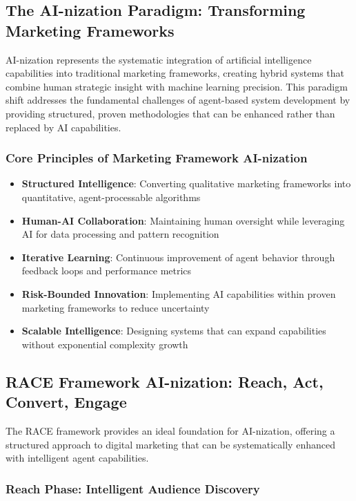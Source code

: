 \subsection{The AI-nization Paradigm: Transforming Marketing Frameworks}

AI-nization represents the systematic integration of artificial intelligence capabilities into traditional marketing frameworks, creating hybrid systems that combine human strategic insight with machine learning precision. This paradigm shift addresses the fundamental challenges of agent-based system development by providing structured, proven methodologies that can be enhanced rather than replaced by AI capabilities.

\subsubsection{Core Principles of Marketing Framework AI-nization}

\begin{itemize}
    \item \textbf{Structured Intelligence}: Converting qualitative marketing frameworks into quantitative, agent-processable algorithms
    \item \textbf{Human-AI Collaboration}: Maintaining human oversight while leveraging AI for data processing and pattern recognition
    \item \textbf{Iterative Learning}: Continuous improvement of agent behavior through feedback loops and performance metrics
    \item \textbf{Risk-Bounded Innovation}: Implementing AI capabilities within proven marketing frameworks to reduce uncertainty
    \item \textbf{Scalable Intelligence}: Designing systems that can expand capabilities without exponential complexity growth
\end{itemize}

\subsection{RACE Framework AI-nization: Reach, Act, Convert, Engage}

The RACE framework provides an ideal foundation for AI-nization, offering a structured approach to digital marketing that can be systematically enhanced with intelligent agent capabilities.

\subsubsection{Reach Phase: Intelligent Audience Discovery}

